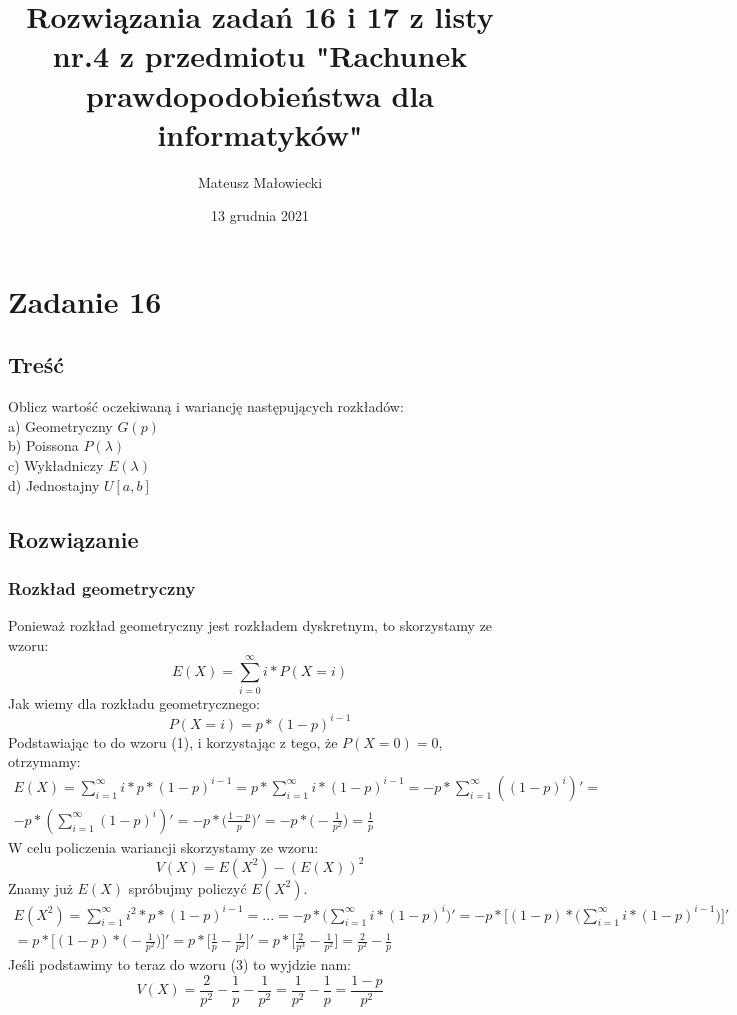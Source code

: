\documentclass[10pt, a4paper]{article}
\title{Rozwiązania zadań 16 i 17 z listy nr.4 z przedmiotu "Rachunek prawdopodobieństwa dla informatyków"}
\date{13 grudnia 2021}
\author{Mateusz Małowiecki}
\begin{document}
\maketitle
\section*{Zadanie 16}
\subsection*{Treść}
Oblicz wartość oczekiwaną i wariancję następujących rozkładów: \\
a) Geometryczny $G(p)$ \\
b) Poissona $P(\lambda)$ \\
c) Wykładniczy $E(\lambda)$ \\
d) Jednostajny $U[a,b]$  \\
\subsection*{Rozwiązanie}
\subsubsection*{Rozkład geometryczny}
Ponieważ rozkład geometryczny jest rozkładem dyskretnym, to skorzystamy ze wzoru:
\begin{equation}
E(X) = \sum_{i=0}^{\infty} i * P(X = i)
\end{equation}
Jak wiemy dla rozkładu geometrycznego:
\begin{equation}
P(X = i) = p * (1 - p)^{i-1}
\end{equation}
Podstawiając to do wzoru (1), i korzystając z tego, że $P(X=0) = 0 $, otrzymamy:
\begin{align*}
E(X) = \sum_{i=1}^{\infty} i * p * (1 - p)^{i-1} = p *  \sum_{i=1}^{\infty} i * (1 - p)^{i-1} = - p * \sum_{i=1}^{\infty} ((1 - p) ^ i)' = \\ -p * (\sum_{i=1}^{\infty} (1 - p) ^ i)' = -p * \Big(\frac{1-p}{p}\Big)' = -p * \Big(-\frac{1}{p^2}\Big) = \frac{1}{p}
\end{align*}
W celu policzenia wariancji skorzystamy ze wzoru:
\begin{equation}
V(X) = E(X^2) - (E(X))^2
\end{equation}
Znamy już $E(X)$ spróbujmy policzyć $E(X^2)$.
\begin{align*}
E(X^2) = \sum_{i=1}^{\infty} i^2 * p * (1 - p)^{i-1} = ... = -p * \Big(\sum_{i=1}^{\infty} i * (1 - p) ^ i\Big)' = -p * \Big[(1 - p) * \Big(\sum_{i=1}^{\infty} i * (1 - p) ^ {i - 1}\Big)\Big]' \\ = p * \Big[(1 - p) * \Big(-\frac{1}{p^2}\Big)\Big]' = p * \Big[\frac{1}{p} - \frac{1}{p^2} \Big]' = p * \Big[ \frac{2}{p^3} - \frac{1}{p^2} \Big] = \frac{2}{p^2} - \frac{1}{p}
\end{align*}
Jeśli podstawimy to teraz do wzoru (3) to wyjdzie nam:
\begin{equation}
V(X) = \frac{2}{p^2} - \frac{1}{p} - \frac{1}{p^2} = \frac{1}{p^2} - \frac{1}{p} = \frac{1 - p}{p^2}
\end{equation}
\end{document}
